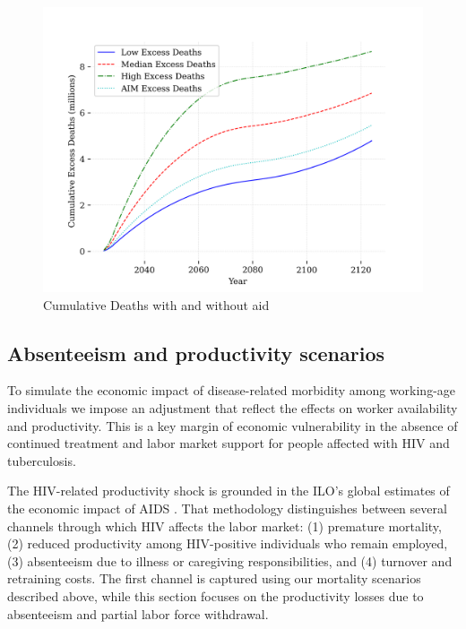 \documentclass[letterpaper,12pt]{article}
\theoremstyle{definition}
\begin{document}
\begin{spacing}{1.5}
\begin{figure}[H]
    \caption{Cumulative Deaths with and without aid}
    \centering
    \includegraphics[scale=0.75]{./tables_figures/cumulative_excess_deaths.png}
\end{figure}


\subsection{Absenteeism and productivity scenarios}
To simulate the economic impact of disease-related morbidity among working-age individuals we impose an adjustment that reflect the effects on worker availability and productivity. This is a key margin of economic vulnerability in the absence of continued treatment and labor market support for people affected with HIV and tuberculosis. 

The HIV-related productivity shock is grounded in the ILO’s global estimates of the economic impact of AIDS \citep{ILO2018}. That methodology distinguishes between several channels through which HIV affects the labor market: (1) premature mortality, (2) reduced productivity among HIV-positive individuals who remain employed, (3) absenteeism due to illness or caregiving responsibilities, and (4) turnover and retraining costs. The first channel is captured using our mortality scenarios described above, while this section focuses on the productivity  losses due to absenteeism and partial labor force withdrawal.


\end{spacing}
\end{document}
